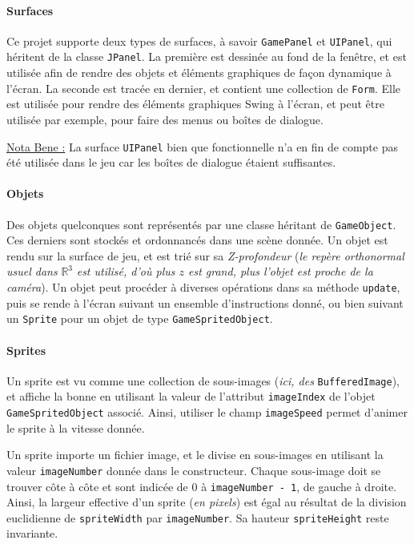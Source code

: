 \documentclass[paper=a4,fontsize=12pt,titlepage]{scrartcl}
\begin{document}
    \paragraph{Surfaces} Ce projet supporte deux types de surfaces, à savoir \verb|GamePanel| et \verb|UIPanel|, qui
    héritent de la classe \verb|JPanel|. La première est dessinée au fond de la fenêtre, et est utilisée afin de rendre
    des objets et éléments graphiques de façon dynamique à l'écran. La seconde est tracée en dernier, et contient une collection
    de \verb|Form|. Elle est utilisée pour rendre des éléments graphiques Swing à l'écran, et peut être utilisée par exemple,
    pour faire des menus ou boîtes de dialogue.

    \underline{Nota Bene :} La surface \verb|UIPanel| bien que fonctionnelle n'a en fin de compte pas été utilisée dans le
    jeu car les boîtes de dialogue étaient suffisantes.

    \paragraph{Objets} Des objets quelconques sont représentés par une classe héritant de \verb|GameObject|. Ces derniers
    sont stockés et ordonnancés dans une scène donnée. Un objet est rendu sur la surface de jeu, et est trié sur sa
    \textit{Z-profondeur} (\textit{le repère orthonormal usuel dans} $\mathbb{R}^3$ \textit{est utilisé, d'où plus
        $z$ est grand, plus l'objet est proche de la caméra}). Un objet peut procéder à diverses opérations dans sa méthode
    \verb|update|, puis se rende à l'écran suivant un ensemble d'instructions donné, ou bien suivant un \verb|Sprite|
    pour un objet de type \verb|GameSpritedObject|.

    \paragraph{Sprites} Un sprite est vu comme une collection de sous-images (\textit{ici, des } \verb|BufferedImage|), et
    affiche la bonne en utilisant la valeur de l'attribut \verb|imageIndex| de l'objet \verb|GameSpritedObject| associé.
    Ainsi, utiliser le champ \verb|imageSpeed| permet d'animer le sprite à la vitesse donnée.

    Un sprite importe un fichier image, et le divise en sous-images en utilisant la valeur \verb|imageNumber|
    donnée dans le constructeur. Chaque sous-image doit se trouver côte à côte et sont indicée de 0 à \verb|imageNumber - 1|,
    de gauche à droite. Ainsi, la largeur effective d'un sprite (\textit{en pixels}) est égal au résultat de la division euclidienne de \verb|spriteWidth|
    par \verb|imageNumber|. Sa hauteur \verb|spriteHeight| reste invariante.
\end{document}
